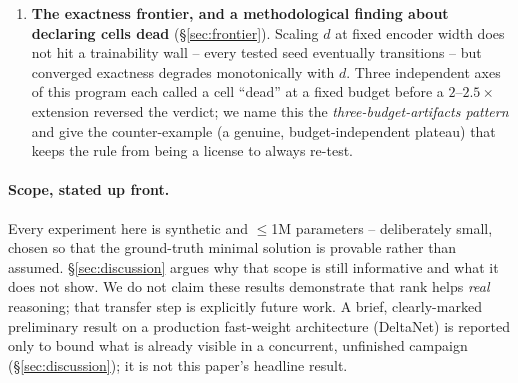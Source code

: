 \begin{enumerate}
      raw keys needed.
\item \textbf{The exactness frontier, and a methodological finding about
      declaring cells dead} (\S\ref{sec:frontier}). Scaling $d$ at fixed
      encoder width does not hit a trainability wall -- every tested seed
      eventually transitions -- but converged exactness degrades
      monotonically with $d$. Three independent axes of this program each
      called a cell ``dead'' at a fixed budget before a
      $2$--$2.5\times$ extension reversed the verdict; we name this the
      \emph{three-budget-artifacts pattern} and give the counter-example
      (a genuine, budget-independent plateau) that keeps the rule from
      being a license to always re-test.
\end{enumerate}

\paragraph{Scope, stated up front.} Every experiment here is synthetic and
$\leq$1M parameters -- deliberately small, chosen so that the ground-truth
minimal solution is provable rather than assumed. \S\ref{sec:discussion}
argues why that scope is still informative and what it does not show. We do
not claim these results demonstrate that rank helps \emph{real} reasoning;
that transfer step is explicitly future work. A brief, clearly-marked
preliminary result on a production fast-weight architecture (DeltaNet) is
reported only to bound what is already visible in a concurrent, unfinished
campaign (\S\ref{sec:discussion}); it is not this paper's headline result.

